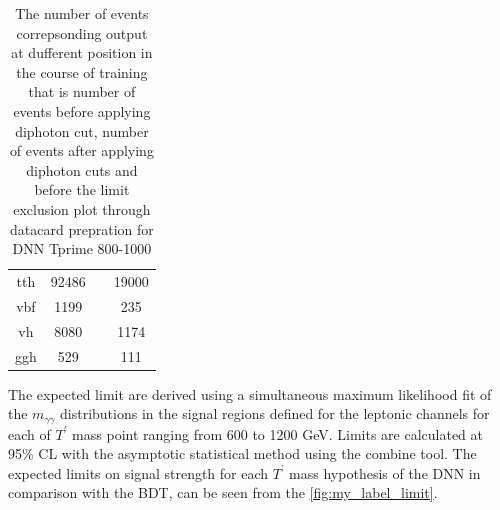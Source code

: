 \begin{table}[h]
{\begin{tabular}{|cccc|}
       tth        &   92486        &         &     19000     \\
       vbf        &     1199      &         &    235      \\
        vh              &   8080        &         &    1174      \\        
        ggh       &    529       &         &      111    \\ \hline
    \end{tabular}}
    \caption{The number of events correpsonding output at dufferent position in the course of training that is number of events before applying diphoton cut, number of events after applying diphoton cuts and before the limit exclusion plot through datacard prepration for DNN Tprime 800-1000}
    \label{tab:my_label_table_11}
\end{table}













The expected limit are derived using a simultaneous maximum likelihood fit of the $m_{\gamma\gamma}$ distributions in the signal regions defined for the leptonic channels for each of $T^{'}$ mass point ranging from 600 to 1200 GeV. Limits are calculated at 95\% CL with the asymptotic statistical method using the combine tool. The expected limits on signal strength for each $T^’$ mass hypothesis of the DNN in comparison with the BDT, can be seen  from the \autoref{fig:my_label_limit}. 

